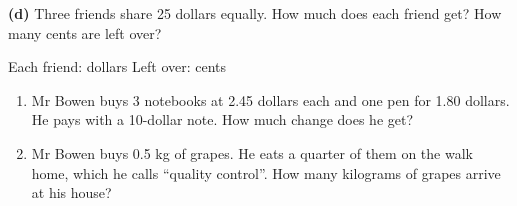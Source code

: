 \documentclass[12pt,a4paper]{article}
\newif\iffr
\newcommand{\fr}[1]{\unskip\iffr\par\vspace{1pt}\noindent{\small\itshape\color{black!60}#1}\par\fi}
\newcommand{\fq}[1]{\guillemotleft\,#1\,\guillemotright}
\begin{document}
\vspace{2pt}
\noindent \textbf{(d)} Three friends share 25 dollars equally. How much does each
friend get? How many cents are left over?
\fr{(d) Trois amis se partagent \'equitablement 25 dollars. Combien chacun
re\c{c}oit-il~? Combien de cents reste-t-il (\eng{left over})~?}

\vspace{5pt}
\noindent\hspace*{1.6em}Each friend: \blank[3.0cm] dollars \hfill
Left over: \blank[2.4cm] cents


\begin{enumerate}[label=(\alph*), itemsep=6pt]
  \item \begin{minipage}[t]{\linewidth}
        Mr Bowen buys 3 notebooks at 2.45 dollars each and one pen for 1.80
        dollars. He pays with a 10-dollar note. How much change does he get?
        \fr{Mr Bowen ach\`ete 3 cahiers \`a 2.45 dollars chacun et un stylo \`a 1.80
        dollar. Il paie avec un billet de 10 dollars. Combien de monnaie lui
        rend-on~?}
        \begin{workspace}[2.7cm]\end{workspace}
        \end{minipage}
  \item \begin{minipage}[t]{\linewidth}
        Mr Bowen buys 0.5 kg of grapes. He eats a quarter of them on the walk home,
        which he calls ``quality control''. How many kilograms of grapes arrive at
        his house?
        \fr{Mr Bowen ach\`ete 0.5 kg de raisin. Sur le chemin du retour, il en mange
        un quart (\eng{a quarter})~: c'est du \fq{contr\^ole qualit\'e}, dit-il.
        Combien de kilogrammes de raisin arrivent chez lui~?}
        \begin{workspace}[2.7cm]\end{workspace}
        \end{minipage}
\end{enumerate}

\end{document}
